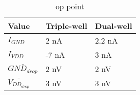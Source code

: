 
\begin{table}[H]
	\label{tab_op}
	\centering
	\begin{tabular}{lll}
		Value  & Triple-well & Dual-well \\ \hline
		$I_{GND}$                               & 2 nA          & 2.2 nA    \\
		$I_{VDD}$                                & -7 nA        & 3 nA        \\
		$\overline{GND_{drop}}$    & 2 nV         & 2 nV        \\
		$\overline{V_{DD_{drop}}}$    & 3 nV         & 3 nV       
	\end{tabular}
	\caption{op point}
\end{table}
